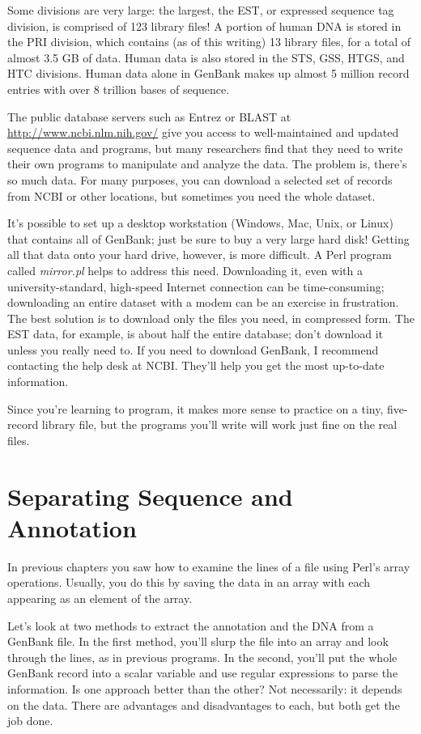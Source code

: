 Some divisions are very large: the largest, the EST, or expressed sequence tag division, is comprised of 123 library files! A portion of human DNA is stored in the PRI division, which contains (as of this writing) 13 library files, for a total of almost 3.5 GB of data. Human data is also stored in the STS, GSS, HTGS, and HTC divisions. Human data alone in GenBank makes up almost 5 million record entries with over 8 trillion bases of sequence.

The public database servers such as Entrez or BLAST at \href{http://www.ncbi.nlm.nih.gov/}{http://www.ncbi.nlm.nih.gov/} give you access to well-maintained and updated sequence data and programs, but many researchers find that they need to write their own programs to manipulate and analyze the data. The problem is, there's so much data. For many purposes, you can download a selected set of records from NCBI or other locations, but sometimes you need the whole dataset.

It's possible to set up a desktop workstation (Windows, Mac, Unix, or Linux) that contains all of GenBank; just be sure to buy a very large hard disk! Getting all that data onto your hard drive, however, is more difficult. A Perl program called \textit{mirror.pl} helps to address this need. Downloading it, even with a university-standard, high-speed Internet connection can be time-consuming; downloading an entire dataset with a modem can be an exercise in frustration. The best solution is to download only the files you need, in compressed form. The EST data, for example, is about half the entire database; don't download it unless you really need to. If you need to download GenBank, I recommend contacting the help desk at NCBI. They'll help you get the most up-to-date information.

Since you're learning to program, it makes more sense to practice on a tiny, five-record library file, but the programs you'll write will work just fine on the real files.

\section{Separating Sequence and Annotation}
In previous chapters you saw how to examine the lines of a file using Perl's array operations. Usually, you do this by saving the data in an array with each appearing as an element of the array.

Let's look at two methods to extract the annotation and the DNA from a GenBank file. In the first method, you'll slurp the file into an array and look through the lines, as in previous programs. In the second, you'll put the whole GenBank record into a scalar variable and use regular expressions to parse the information. Is one approach better than the other? Not necessarily: it depends on the data. There are advantages and disadvantages to each, but both get the job done.

